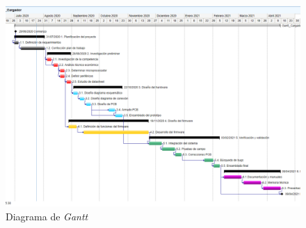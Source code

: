\documentclass[11pt]{charter}
\begin{document}
\begin{figure}[H]
\centering 
\includegraphics[angle=90, width=1\textwidth]{./Figuras/Gantt_diag.png}
\caption{Diagrama de \textit{Gantt}}
\label{fig:Diagrama Gantt}
\end{figure}




\end{document}
